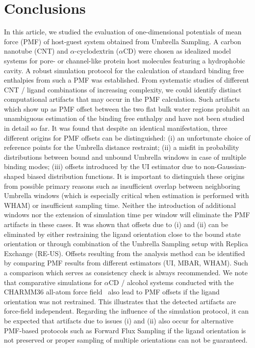\documentclass[9pt,lessons]{livecoms}
\begin{document}
\section{Conclusions}

In this article, we studied the evaluation of one-dimensional potentials of mean force (PMF) of host-guest system obtained from Umbrella Sampling. 
A carbon nanotube (CNT) and $\alpha$-cyclodextrin ($\alpha$CD) were chosen as idealized model systems for pore- or channel-like protein host molecules featuring a hydrophobic cavity. 
A robust simulation protocol for the calculation of standard binding free enthalpies from such a PMF was established.
From systematic studies of different CNT / ligand combinations of increasing complexity, we could identify distinct computational artifacts that may occur in the PMF calculation.
Such artifacts which show up as PMF offset between the two flat bulk water regions prohibit an unambiguous estimation of the binding free enthalpy and have not been studied in detail so far.
It was found that despite an identical manifestation, three different origins for PMF offsets can be distinguished:
(i) an unfortunate choice of reference points for the Umbrella distance restraint;
(ii) a misfit in probability distributions between bound and unbound Umbrella windows in case of multiple binding modes; 
(iii) offsets introduced by the UI estimator due to non-Gaussian-shaped biased distribution functions.
It is important to distinguish these origins from possible primary reasons such as insufficient overlap between neighboring Umbrella windows (which is especially critical when estimation is performed with WHAM) 
or insufficient sampling time.
Neither the introduction of additional windows nor the extension of simulation time per window will eliminate the PMF artifacts in these cases.
It was shown that offsets due to (i) and (ii) can be eliminated by either restraining the ligand orientation close to the bound state orientation or through combination of the Umbrella Sampling setup with Replica Exchange (RE-US). 
Offsets resulting from the analysis method can be identified by comparing PMF results from different estimators (UI, MBAR, WHAM). 
Such a comparison which serves as consistency check is always recommended. 
We note that comparative simulations for $\alpha$CD / alcohol systems conducted with the CHARMM36 all-atom force field~\cite{markthaler2017molecular} also lead to PMF offsets if the ligand orientation was not restrained. 
This illustrates that the detected artifacts are force-field independent.
Regarding the influence of the simulation protocol, it can be expected that artifacts due to issues (i) and (ii) also 
occur for alternative PMF-based protocols such as Forward Flux Sampling if the ligand orientation is not preserved or proper sampling of multiple orientations can not be guaranteed.
\end{document}
